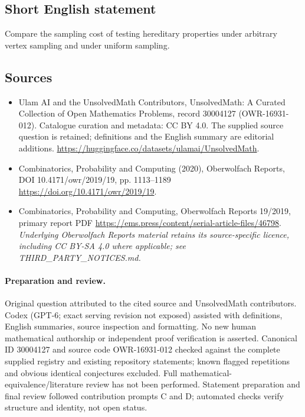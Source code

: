 \documentclass[11pt]{article}
\begin{document}
\subsection{Short English statement}
Compare the sampling cost of testing hereditary properties under arbitrary vertex sampling and under uniform sampling.
\subsection{Sources}
\begin{itemize}
\item[\hypertarget{source:30004127:1}{S1}] Ulam AI and the UnsolvedMath Contributors, UnsolvedMath: A Curated Collection of Open Mathematics Problems, record 30004127 (OWR-16931-012). Catalogue curation and metadata: CC BY 4.0. The supplied source question is retained; definitions and the English summary are editorial additions.
\url{https://huggingface.co/datasets/ulamai/UnsolvedMath}.
\item[\hypertarget{source:30004127:2}{S2}] Combinatorics, Probability and Computing (2020), Oberwolfach Reports, DOI 10.4171/owr/2019/19, pp. 1113--1189
\url{https://doi.org/10.4171/owr/2019/19}.
\item[\hypertarget{source:30004127:3}{S3}] Combinatorics, Probability and Computing, Oberwolfach Reports 19/2019, primary report PDF
\url{https://ems.press/content/serial-article-files/46798}.
\textit{Underlying Oberwolfach Reports material retains its source-specific licence, including CC BY-SA 4.0 where applicable; see THIRD\_PARTY\_NOTICES.md.}
\end{itemize}
\paragraph{Preparation and review.}
Original question attributed to the cited source and UnsolvedMath contributors. Codex (GPT-6; exact serving revision not exposed) assisted with definitions, English summaries, source inspection and formatting. No new human mathematical authorship or independent proof verification is asserted. Canonical ID 30004127 and source code OWR-16931-012 checked against the complete supplied registry and existing repository statements; known flagged repetitions and obvious identical conjectures excluded. Full mathematical-equivalence/literature review has not been performed. Statement preparation and final review followed contribution prompts C and D; automated checks verify structure and identity, not open status.
\label{end:30004127}
\end{document}
